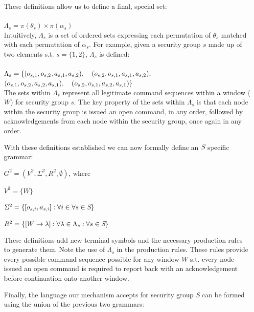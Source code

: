 \documentclass{llncs}
\newcommand{\tab}{\hspace*{2em}}
\begin{document}
These definitions allow us to define a final, special set:\\
\\
$\Lambda_s = \pi(\theta_s) \times \pi(\alpha_s)$\\

Intuitively, $\Lambda_s$ is a set of ordered sets expressing each permutation of $\theta_s$ matched with each permutation of $\alpha_s$. For example, given a security group $s$ made up of two elements s.t. $s = \{1, 2\}$, $\Lambda_s$ is defined:\\
\\
$\Lambda_s = \{ (o_{s,1}, o_{s,2}, a_{s,1}, a_{s,2}),\hspace*{1.0em} (o_{s,2}, o_{s,1}, a_{s,1}, a_{s,2}),$\\
\hspace*{3.0em}$ (o_{s,1}, o_{s,2}, a_{s,2}, a_{s,1}),\hspace*{1.0em} (o_{s,2}, o_{s,1}, a_{s,2}, a_{s,1})\}$\\

The sets within $\Lambda_s$ represent all legitimate command sequences within a window ($W$) for security group $s$. The key property of the sets within $\Lambda_s$ is that each node within the security group is issued an open command, in any order, followed by acknowledgements from each node within the security group, once again in any order.

With these definitions established we can now formally define an $\emph{S}$ specific grammar:

\tab $G^2 = (V^2, \Sigma^2, R^2, \emptyset)$, where

\tab $V^2 =\{W\}$

\tab $\Sigma ^2 = \{[o_{s,i}, a_{s,i}]:\forall i \in \forall s\in \emph{S}\}$

\tab $R^2 = \{[W\rightarrow \lambda  ] :\forall \lambda \in \Lambda_s :\forall s\in \emph{S}\}$


These definitions add new terminal symbols and the necessary production rules to generate them. Note the use of $\Lambda_s$ in the production rules. These rules provide every possible command sequence possible for any window $W$ s.t. every node issued an open command is required to report back with an acknowledgement before continuation onto another window.

Finally, the language our mechanism accepts for security group \emph{S} can be formed using the union of the previous two grammars:\\
\end{document}
